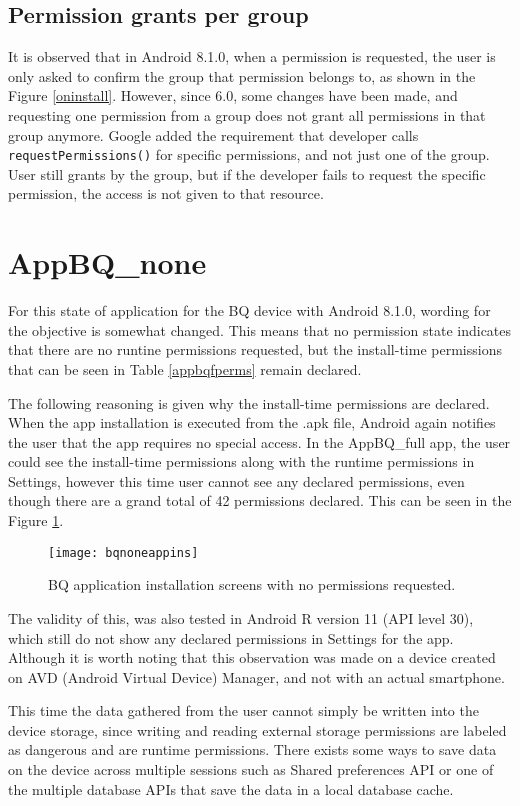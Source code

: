 \documentclass[
  a4paper,  %
  twoside,  %
  bibliography=totoc,
  headsepline,
  cleardoublepage=empty,
  parskip=half,
  draft=false,
  open=any
]{scrbook}
\begin{document}
\subsection{Permission grants per group}
It is observed that in Android 8.1.0, when a permission is requested, the user is only asked to confirm the group that permission belongs to, as shown in the Figure \ref{oninstall}. However, since 6.0, some changes have been made, and requesting one permission from a group does not grant all permissions in that group anymore. Google added the requirement that developer calls \texttt{requestPermissions()} for specific permissions, and not just one of the group. User still grants by the group, but if the developer fails to request the specific permission, the access is not given to that resource.

\section{AppBQ\_none}
For this state of application for the BQ device with Android 8.1.0, wording for the objective is somewhat changed. This means that no permission state indicates that there are no runtine permissions requested, but the install-time permissions that can be seen in Table \ref{appbqfperms} remain declared. 

The following reasoning is given why the install-time permissions are declared. When the app installation is executed from the .apk file, Android again notifies the user that the app requires no special access. In the AppBQ\_full app, the user could see the install-time permissions along with the runtime permissions in Settings, however this time user cannot see any declared permissions, even though there are a grand total of 42 permissions declared. This can be seen in the Figure \ref{bqnoneappins}. 
\begin{figure}\centering
	\texttt{[image: bqnoneappins]}
	\caption{BQ application installation screens with no permissions requested.}
	\label{bqnoneappins}
\end{figure}
The validity of this, was also tested in Android R version 11 (API level 30), which still do not show any declared permissions in Settings for the app. Although it is worth noting that this observation was made on a device created on AVD (Android Virtual Device) Manager, and not with an actual smartphone.

This time the data gathered from the user cannot simply be written into the device storage, since writing and reading external storage permissions are labeled as dangerous and are runtime permissions. There exists some ways to save data on the device across multiple sessions such as Shared preferences API or one of the multiple database APIs that save the data in a local database cache.
\end{document}
